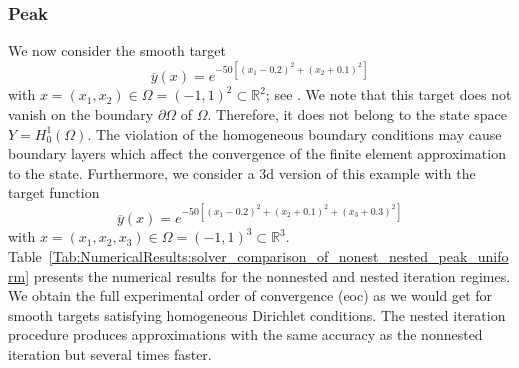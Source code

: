 \documentclass{article}
\numberwithin{equation}{section}
\begin{document}
\subsubsection{Peak}
\label{Subsubsection:NumericalResults:Peak}
We now consider the smooth target
\begin{equation*}
\overline{y}(x) = e^{-50[(x_1 - 0.2)^2 + (x_2 + 0.1)^2]}
\end{equation*}
with $x=(x_1,x_2) \in \Omega = (-1,1)^2 \subset \mathbb{R}^2$;
see \cite{ClarsonKunisch:2011ESAIM:COCV}. We note that this target does not
vanish on the boundary $\partial \Omega$ of $\Omega$. 
Therefore, it does not belong to the state space $Y=H^1_0(\Omega)$.
The violation of the homogeneous boundary conditions may cause 
boundary layers which affect the convergence of the finite 
element approximation to the state. Furthermore, we consider a 3d version
of this example with the target function
\begin{equation*}
\overline{y}(x) = e^{-50[(x_1 - 0.2)^2 + (x_2 + 0.1)^2 + (x_3+0.3)^2]}
\end{equation*}
with $x=(x_1,x_2,x_3) \in \Omega = (-1,1)^3 \subset \mathbb{R}^3$.
Table~\ref{Tab:NumericalResults:solver_comparison_of_nonest_nested_peak_uniform}
presents the numerical results for the nonnested and nested iteration regimes.
We obtain the full experimental order of convergence (eoc) as we would get 
for smooth targets satisfying homogeneous Dirichlet conditions. The nested
iteration procedure produces approximations with the same accuracy 
as the nonnested iteration but several times faster. 
\end{document}
